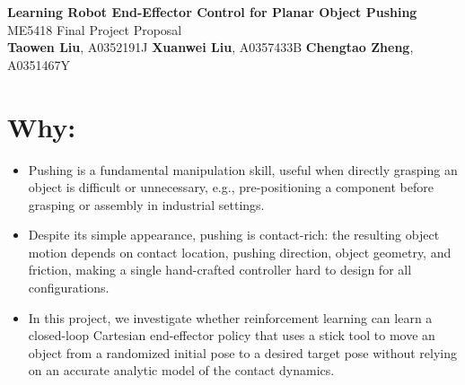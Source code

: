 \documentclass[11pt,onecolumn]{IEEEtran}
\begin{document}

\begin{flushleft}
    {\huge \textbf{Learning Robot End-Effector Control for Planar Object Pushing}}\\[6pt]
    {\large \color{subtitleblue} ME5418 Final Project Proposal}\\[10pt]

    \textbf{Taowen Liu}, A0352191J
    \qquad
    \textbf{Xuanwei Liu}, A0357433B
    \qquad
    \textbf{Chengtao Zheng}, A0351467Y
\end{flushleft}

\vspace{0.2cm}



\section*{Why:}

\begin{itemize}

    \item
    Pushing is a fundamental manipulation skill, useful when directly grasping an
    object is difficult or unnecessary, e.g., pre-positioning a component before
    grasping or assembly in industrial settings.

    \item
    Despite its simple appearance, pushing is contact-rich: the resulting object
    motion depends on contact location, pushing direction, object geometry, and
    friction, making a single hand-crafted controller hard to design for all
    configurations.

    \item
    In this project, we investigate whether reinforcement learning can learn a
    closed-loop Cartesian end-effector policy that uses a stick tool to move an
    object from a randomized initial pose to a desired target pose without
    relying on an accurate analytic model of the contact dynamics.

\end{itemize}


\end{document}
